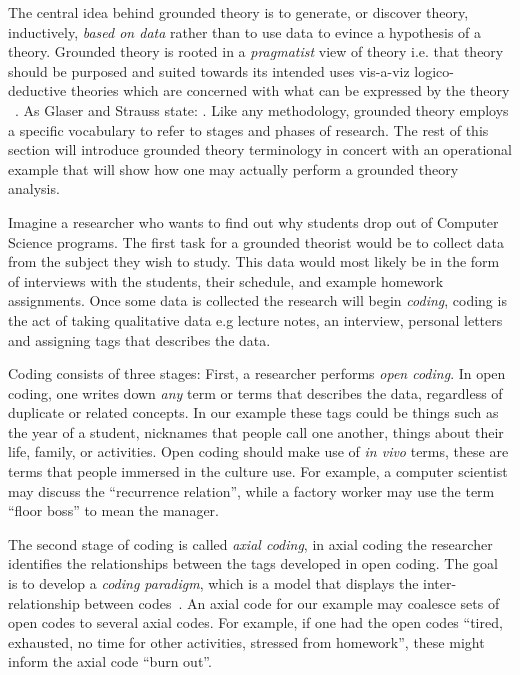 \documentclass[sigconf]{acmart}
\begin{document}
The central idea behind grounded theory is to generate, or discover theory,
inductively, \emph{based on data} rather than to use data to evince a hypothesis
of a theory. Grounded theory is rooted in a \emph{pragmatist} view of theory
i.e. that theory should be purposed and suited towards its intended uses
vis-a-viz logico-deductive theories which are concerned with what can be
expressed by the theory ~\cite{Strauss67discoveryof}. As Glaser and Strauss
state:
\newline
\newline
{}.
\newline
\newline
Like any methodology, grounded theory employs a specific vocabulary to refer to
stages and phases of research. The rest of this section will introduce grounded theory
terminology in concert with an operational example that will show how one may
actually perform a grounded theory analysis.


Imagine a researcher who wants to find out why students drop out of
Computer Science programs. The first task for a grounded theorist would be to
collect data from the subject they wish to study. This data would most likely be
in the form of interviews with the students, their schedule, and example
homework assignments. Once some data is collected the research will begin
\emph{coding}, coding is the act of taking qualitative data e.g lecture notes,
an interview, personal letters and assigning tags that describes the data.
 
Coding consists of three stages\cite{corbin2014basics}: First, a researcher
performs \emph{open coding}. In open coding, one writes down \emph{any} term or
terms that describes the data, regardless of duplicate or related concepts. In
our example these tags could be things such as the year of a student, nicknames
that people call one another, things about their life, family, or activities.
Open coding should make use of \emph{in vivo} terms, these are terms that people
immersed in the culture use. For example, a computer scientist may discuss the
``recurrence relation'', while a factory worker may use the term ``floor boss''
to mean the manager.
 
The second stage of coding is called \emph{axial coding}, in axial coding the
researcher identifies the relationships between the tags developed in open
coding. The goal is to develop a \emph{coding paradigm}, which is a model that
displays the inter-relationship between codes~\cite{corbin2014basics}. An axial
code for our example may coalesce sets of open codes to several axial codes. For
example, if one had the open codes ``tired, exhausted, no time for other
activities, stressed from homework'', these might inform the axial code ``burn
out''.
 
\end{document}
